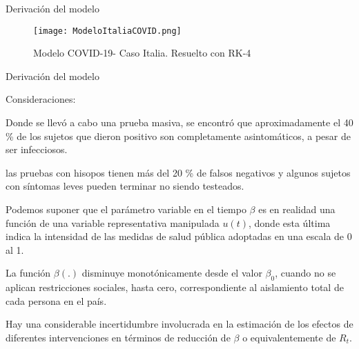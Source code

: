 \documentclass{beamer}
\begin{document}
\begin{frame}{Derivación del modelo}
\begin{justify}
\begin{figure}
    \centering
    \texttt{[image: ModeloItaliaCOVID.png]}
    \caption{Modelo COVID-19- Caso Italia. Resuelto con RK-4}
    \label{fig:CovidItalia}
\end{figure}
\end{justify}
\end{frame}


\begin{frame}{Derivación del modelo}
\begin{justify}
{\footnotesize
Consideraciones:

\vspace{0.2cm}
\item Donde se llevó a cabo una prueba masiva, se encontró que aproximadamente el 40 \% de los sujetos que dieron positivo son completamente asintomáticos, a pesar de ser infecciosos.

\vspace{0.2cm}
\item las pruebas con hisopos tienen más del 20 \% de falsos negativos y algunos sujetos con síntomas leves pueden terminar no siendo testeados.

\vspace{0.2cm}
Podemos suponer que el parámetro variable en el tiempo $\beta$ es en realidad una función de una variable representativa manipulada $u(t)$, donde esta última indica la intensidad de las medidas de salud pública adoptadas en una escala de 0 al 1.

\vspace{0.2cm}
La función $\beta(.)$ disminuye monotónicamente desde el valor $\beta_0$, cuando no se aplican restricciones sociales, hasta cero, correspondiente al aislamiento total de cada persona en el país.

\vspace{0.2cm}
Hay una considerable incertidumbre involucrada en la estimación de los efectos de diferentes intervenciones en términos de reducción de $\beta$ o equivalentemente de $R_t$.


}
\end{justify}
\end{frame}
\end{document}
